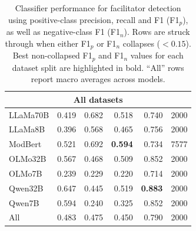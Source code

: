 \documentclass[11pt]{article}
\theoremstyle{definition}
\theoremstyle{plain}
\begin{document}
\begin{table}[t]
\begin{tabular}{lrrrrr}
		\midrule
		\multicolumn{6}{c}{\textbf{All datasets}} \\
		\midrule
		LLaMa70B & 0.419 & 0.682 & 0.518 & 0.740 & 2000 \\
		LLaMa8B  & 0.396 & 0.568 & 0.465 & 0.756 & 2000 \\
		ModBert  & 0.521 & 0.692 & \textbf{0.594} & 0.734 & 7577 \\
		OLMo32B  & 0.567 & 0.468 & 0.509 & 0.852 & 2000 \\
		OLMo7B   & 0.239 & 0.229 & 0.220 & 0.714 & 2000 \\
		Qwen32B  & 0.647 & 0.445 & 0.519 & \textbf{0.883} & 2000 \\
		Qwen7B   & 0.594 & 0.240 & 0.325 & 0.852 & 2000 \\
		{All} & {0.483} & {0.475} & {0.450} & {0.790} & {2000} \\
		
		\bottomrule
	\end{tabular}
	\caption{Classifier performance for facilitator detection using positive-class precision, recall and F1 (F1$_p$), as well as negative-class F1 (F1$_n$). Rows are struck through when either F1$_p$ or F1$_n$ collapses ($<0.15$). Best non-collapsed F1$_p$ and F1$_n$ values for each dataset split are highlighted in bold. ``All'' rows report macro averages across models.}
	\label{tab:facilitator-detection}
\end{table}
\end{document}
